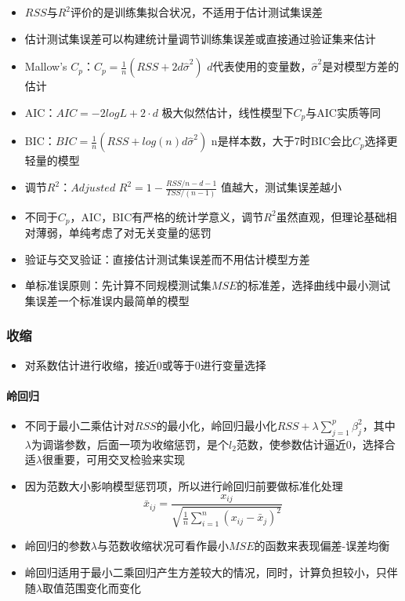 \documentclass[]{book}
\providecommand{\tightlist}{%
  \setlength{\itemsep}{0pt}\setlength{\parskip}{0pt}}
\let\oldparagraph\paragraph
\renewcommand{\paragraph}[1]{\oldparagraph{#1}\mbox{}}
\begin{document}
\begin{itemize}
\tightlist
\item
  \(RSS\)与\(R^2\)评价的是训练集拟合状况，不适用于估计测试集误差
\item
  估计测试集误差可以构建统计量调节训练集误差或直接通过验证集来估计
\item
  Mallow's \(C_p\)：\(C_p = \frac{1}{n} (RSS + 2d\hat \sigma^2)\) \(d\)代表使用的变量数，\(\hat \sigma^2\)是对模型方差的估计
\item
  AIC：\(AIC = -2logL + 2 \cdot d\) 极大似然估计，线性模型下\(C_p\)与AIC实质等同
\item
  BIC：\(BIC = \frac{1}{n}(RSS + log(n)d\hat \sigma^2)\) n是样本数，大于7时BIC会比\(C_p\)选择更轻量的模型
\item
  调节\(R^2\)：\(Adjusted\) \(R^2 = 1 - \frac{RSS/n-d-1}{TSS/(n - 1)}\) 值越大，测试集误差越小
\item
  不同于\(C_p\)，AIC，BIC有严格的统计学意义，调节\(R^2\)虽然直观，但理论基础相对薄弱，单纯考虑了对无关变量的惩罚
\item
  验证与交叉验证：直接估计测试集误差而不用估计模型方差
\item
  单标准误原则：先计算不同规模测试集\(MSE\)的标准差，选择曲线中最小测试集误差一个标准误内最简单的模型
\end{itemize}

\hypertarget{ux6536ux7f29}{%
\subsubsection{收缩}\label{ux6536ux7f29}}

\begin{itemize}
\tightlist
\item
  对系数估计进行收缩，接近0或等于0进行变量选择
\end{itemize}

\hypertarget{ux5cadux56deux5f52}{%
\paragraph{岭回归}\label{ux5cadux56deux5f52}}

\begin{itemize}
\tightlist
\item
  不同于最小二乘估计对\(RSS\)的最小化，岭回归最小化\(RSS + \lambda \sum_{j = 1}^{p} \beta_j^2\)，其中\(\lambda\)为调谐参数，后面一项为收缩惩罚，是个\(l_2\)范数，使参数估计逼近0，选择合适\(\lambda\)很重要，可用交叉检验来实现
\item
  因为范数大小影响模型惩罚项，所以进行岭回归前要做标准化处理\[\bar x_{ij} = \frac{x_{ij}}{\sqrt{\frac{1}{n} \sum_{i = 1}^n (x_{ij} - \bar x_j)^2}}\]
\item
  岭回归的参数\(\lambda\)与范数收缩状况可看作最小\(MSE\)的函数来表现偏差-误差均衡
\item
  岭回归适用于最小二乘回归产生方差较大的情况，同时，计算负担较小，只伴随\(\lambda\)取值范围变化而变化
\end{itemize}
\end{document}
